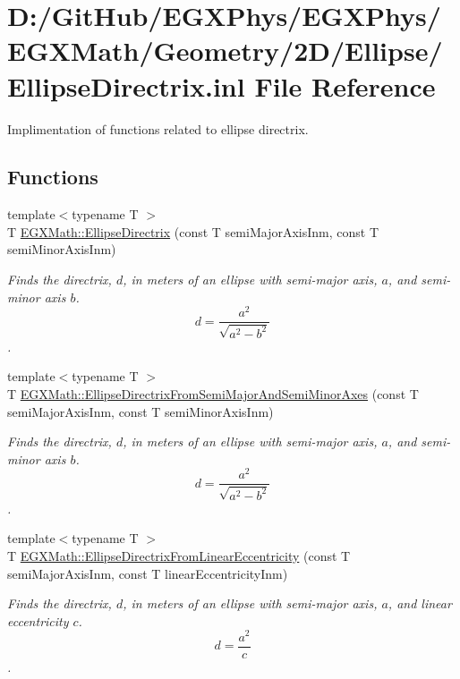 \hypertarget{_ellipse_directrix_8inl}{}\section{D\+:/\+Git\+Hub/\+E\+G\+X\+Phys/\+E\+G\+X\+Phys/\+E\+G\+X\+Math/\+Geometry/2\+D/\+Ellipse/\+Ellipse\+Directrix.inl File Reference}
\label{_ellipse_directrix_8inl}


Implimentation of functions related to ellipse directrix.  


\subsection*{Functions}
\begin{DoxyCompactItemize}
\item 
{\footnotesize template$<$typename T $>$ }\\T \mbox{\hyperlink{group___e_g_x_math-_geometry-2_d-_ellipse-_directrix_gace8f72a8efbc9c18d3eb689151405106}{E\+G\+X\+Math\+::\+Ellipse\+Directrix}} (const T semi\+Major\+Axis\+Inm, const T semi\+Minor\+Axis\+Inm)
\begin{DoxyCompactList}\small\item\em Finds the directrix, $d$, in meters of an ellipse with semi-\/major axis, $a$, and semi-\/minor axis $b$. \[ d=\frac{a^2}{\sqrt{a^2-b^2}} \]. \end{DoxyCompactList}\item 
{\footnotesize template$<$typename T $>$ }\\T \mbox{\hyperlink{group___e_g_x_math-_geometry-2_d-_ellipse-_directrix_ga5e7a411cd0af17a30bae03613b4a675d}{E\+G\+X\+Math\+::\+Ellipse\+Directrix\+From\+Semi\+Major\+And\+Semi\+Minor\+Axes}} (const T semi\+Major\+Axis\+Inm, const T semi\+Minor\+Axis\+Inm)
\begin{DoxyCompactList}\small\item\em Finds the directrix, $d$, in meters of an ellipse with semi-\/major axis, $a$, and semi-\/minor axis $b$. \[ d=\frac{a^2}{\sqrt{a^2-b^2}} \]. \end{DoxyCompactList}\item 
{\footnotesize template$<$typename T $>$ }\\T \mbox{\hyperlink{group___e_g_x_math-_geometry-2_d-_ellipse-_directrix_gaa496c6b5f9717e7ce731dd374f5d0ae8}{E\+G\+X\+Math\+::\+Ellipse\+Directrix\+From\+Linear\+Eccentricity}} (const T semi\+Major\+Axis\+Inm, const T linear\+Eccentricity\+Inm)
\begin{DoxyCompactList}\small\item\em Finds the directrix, $d$, in meters of an ellipse with semi-\/major axis, $a$, and linear eccentricity $c$. \[ d=\frac{a^2}{c} \]. \end{DoxyCompactList}\end{DoxyCompactItemize}


